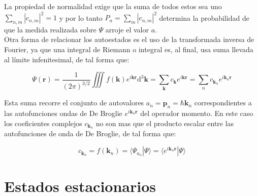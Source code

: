 \documentclass[12pt,a4paper]{article}
\numberwithin{equation}{section}
\numberwithin{figure}{section}
\newcommand{\D}{\mathrm{d}}
\newcommand{\tint}{\iiint}
\newcommand{\rn}{\mathbf{r}}
\newcommand{\pn}{\mathbf{p}}
\newcommand{\kn}{\mathbf{k}}
\begin{document}
La propiedad de normalidad exige que la suma de todos estos sea uno $\sum_{n,m} |c_{n,m}|^2 = 1$  y por lo tanto $P_n = \sum_m |c_{n,m}|^2$ determina la probabilidad de que la medida realizada sobre $\Psi$ arroje el valor $a$.\\

Otra forma de relacionar los autoestados es el uso de la transformada inversa de Fourier, ya que una integral de Riemann o integral es, al final, usa suma llevada al límite infenitesimal, de tal forma que:

\begin{equation}
\Psi (\rn) = \dfrac{1}{(2\pi)^{3/2}} \tint f(\kn) e^{i \kn \rn} \D ^3 \kn = \sum_{\kn} c_\kn e^{i \kn \rn}  = \sum_{n} c_{\kn_n} e^{i \kn_n \rn }
\end{equation}

Esta suma recorre el conjunto de autovalores $a_n = \pn_n = \hbar \kn_n$ correspondientes a las autofunciones ondas de De Broglie $e^{i \kn_n \rn}$ del operador momento. En este caso los coeficientes complejos $c_{\kn_n}$ no son mas que el producto escalar entre las autofunciones de onda de De Broglie, de tal forma que:

\begin{equation}
c_{\kn_n} = f(\kn_n) = \langle \Psi_{a_n} | \Psi \rangle = \langle e^{i \kn_n \rn} | \Psi \rangle
\end{equation}

\section{Estados estacionarios}





\end{document}
